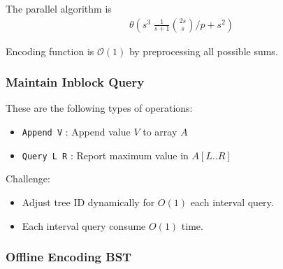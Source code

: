 \begin{frame}
	
	The parallel algorithm is 
	\begin{align*}
		\mathcal{\theta}\left(s^3 \; \frac{1}{s+1} \binom{2s}{s} \bigg/ p + s^2 \right)
	\end{align*}
\end{frame}

\begin{frame}
	
	Encoding function is $\mathcal{O}(1)$ by preprocessing all possible sums.
\end{frame}

\begin{frame}
	\frametitle{Maintain Inblock Query}
	These are the following types of operations:
	\begin{itemize}
		\item \texttt{Append V} : Append value $V$ to array $A$
		\item \texttt{Query L R} : Report maximum value in $A[L .. R]$
	\end{itemize}
	Challenge:
	\begin{itemize}
		\item Adjust tree ID dynamically for $O(1)$ each interval query.
		\item Each interval query consume $O(1)$ time.
	\end{itemize}
\end{frame}

\begin{frame}
	\frametitle{Offline Encoding BST}
	
\end{frame}